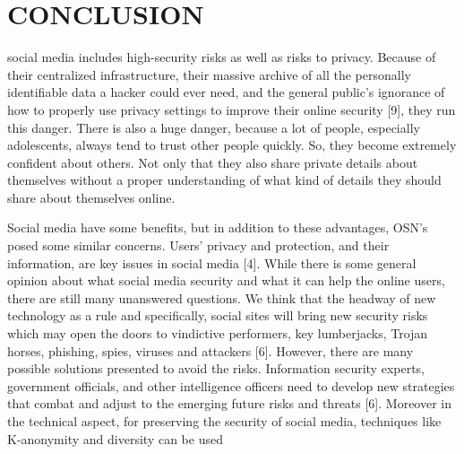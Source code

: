 \chapter{CONCLUSION}

\hspace*{0.3in} social
media includes high-security risks as well as risks to privacy.
Because of their centralized infrastructure, their massive
archive of all the personally identifiable data a hacker could
ever need, and the general public’s ignorance of how to
properly use privacy settings to improve their online security
[9], they run this danger. There is also a huge danger, because
a lot of people, especially adolescents, always tend to trust
other people quickly. So, they become extremely confident
about others. Not only that they also share private details about
themselves without a proper understanding of what kind of
details they should share about themselves online.

   Social media have some benefits, but in addition to these
advantages, OSN's posed some similar concerns. Users'
privacy and protection, and their information, are key issues
in social media [4]. While there is some general opinion about
what social media security and what it can help the online
users, there are still many unanswered questions. We think
that the headway of new technology as a rule and specifically,
social sites will bring new security risks which may open the
doors to vindictive performers, key lumberjacks, Trojan
horses, phishing, spies, viruses and attackers [6]. However,
there are many possible solutions presented to avoid the risks.
Information security experts, government officials, and other
intelligence officers need to develop new strategies that
combat and adjust to the emerging future risks and threats [6].
Moreover in the technical aspect, for preserving the security
of social media, techniques like K-anonymity and diversity
can be used\\



